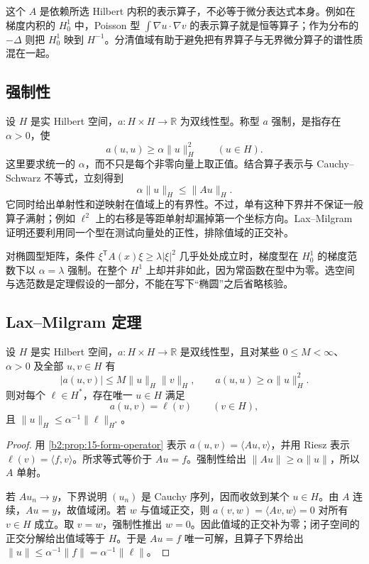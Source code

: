 这个 \(A\) 是依赖所选 Hilbert 内积的表示算子，不必等于微分表达式本身。例如在梯度内积的 \(H_0^1\) 中，Poisson 型 \(\int\nabla u\cdot\nabla v\) 的表示算子就是恒等算子；作为分布的 \(-\Delta\) 则把 \(H_0^1\) 映到 \(H^{-1}\)。分清值域有助于避免把有界算子与无界微分算子的谱性质混在一起。

\subsection{强制性}
\label{b2:subsec:150203}

设 \(H\) 是实 Hilbert 空间，\(a:H\times H\to\mathbb R\) 为双线性型。称型 \(a\) 强制，是指存在 \(\alpha>0\)，使
\[a(u,u)\ge\alpha\lVert u\rVert_H^2\qquad(u\in H).\]
这里要求统一的 \(\alpha\)，而不只是每个非零向量上取正值。结合算子表示与 Cauchy--Schwarz 不等式，立刻得到
\[\alpha\lVert u\rVert_H\le\lVert Au\rVert_H.\]
它同时给出单射性和逆映射在值域上的有界性。不过，单有这种下界并不保证一般算子满射；例如 \(\ell^2\) 上的右移是等距单射却漏掉第一个坐标方向。Lax--Milgram 证明还要利用同一个型在测试向量处的正性，排除值域的正交补。

\ProseParagraphBreak

对椭圆型矩阵，条件 \(\xi^{\mathsf T}A(x)\xi\ge\lambda|\xi|^2\) 几乎处处成立时，梯度型在 \(H_0^1\) 的梯度范数下以 \(\alpha=\lambda\) 强制。在整个 \(H^1\) 上却并非如此，因为常函数在型中为零。选空间与选范数是定理假设的一部分，不能在写下“椭圆”之后省略核验。

\subsection{Lax–Milgram 定理}
\label{b2:subsec:150204}

\begin{theorem}
\label{b2:thm:15-lax-milgram}
设 \(H\) 是实 Hilbert 空间，\(a:H\times H\to\mathbb R\) 是双线性型，且对某些 \(0\le M<\infty\)、\(\alpha>0\) 及全部 \(u,v\in H\) 有
\[|a(u,v)|\le M\lVert u\rVert_H\lVert v\rVert_H,
 \qquad a(u,u)\ge\alpha\lVert u\rVert_H^2.\]
则对每个 \(\ell\in H^*\)，存在唯一 \(u\in H\) 满足
\[a(u,v)=\ell(v)\qquad(v\in H),\]
且 \(\lVert u\rVert_H\le\alpha^{-1}\lVert\ell\rVert_{H^*}\)。
\end{theorem}
\begin{proof}
用 \cref{b2:prop:15-form-operator} 表示 \(a(u,v)=\langle Au,v\rangle\)，并用 Riesz 表示 \(\ell(v)=\langle f,v\rangle\)。所求等式等价于 \(Au=f\)。强制性给出 \(\lVert Au\rVert\ge\alpha\lVert u\rVert\)，所以 \(A\) 单射。

若 \(Au_n\to y\)，下界说明 \((u_n)\) 是 Cauchy 序列，因而收敛到某个 \(u\in H\)。由 \(A\) 连续，\(Au=y\)，故值域闭。若 \(w\) 与值域正交，则 \(a(v,w)=\langle Av,w\rangle=0\) 对所有 \(v\in H\) 成立。取 \(v=w\)，强制性推出 \(w=0\)。因此值域的正交补为零；闭子空间的正交分解给出值域等于 \(H\)。于是 \(Au=f\) 唯一可解，且算子下界给出 \(\lVert u\rVert\le\alpha^{-1}\lVert f\rVert=\alpha^{-1}\lVert\ell\rVert\)。
\end{proof}

